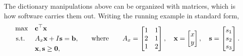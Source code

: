 The dictionary manipulations above can be organized with matrices, which is how software carries them out. Writing the running example in standard form,
\[
\begin{aligned}
\max \quad & \mathbf{c}^\top \mathbf{x} \\
\mbox{ s.t. } \quad & A_x\mathbf{x} + I\mathbf{s}  = \mathbf{b}, \\
& \mathbf{x}, \mathbf{s} \geq \mathbf{0},
\end{aligned}
\qquad\mbox{where}\qquad
A_x =
\begin{bmatrix}
1 & 1 \\
2 & 1 \\
1 & 2
\end{bmatrix},
\quad
\mathbf{x} =
\begin{bmatrix}
x \\
y \\
\end{bmatrix},
\quad
\mathbf{s} =
\begin{bmatrix}
s_1 \\
s_2 \\
s_3
\end{bmatrix}.
\]

